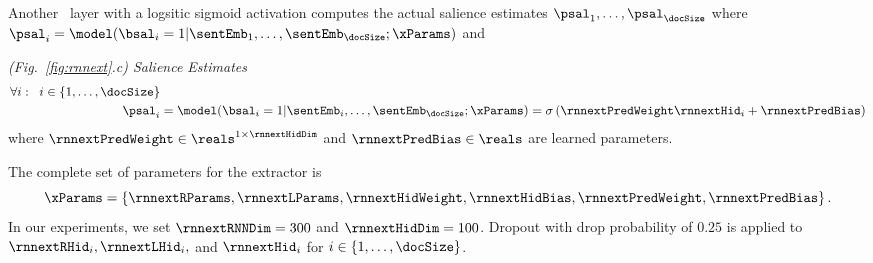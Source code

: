 Another \feedforward~layer
with a logsitic sigmoid activation computes the actual salience 
estimates $\psal_1,\ldots,\psal_\docSize$ where $\psal_i = \model(\bsal_i=1|\sentEmb_1,\ldots,\sentEmb_\docSize;\xParams)$ and 

\vspace{10pt}\noindent\textit{(Fig.~\ref{fig:rnnext}.c) Salience Estimates}
\begin{align}
    \forall i : \;\; i \in \{1,\ldots,\docSize\}& \nonumber \\
    \psal_i &= \model(\bsal_i=1|\sentEmb_i,\ldots,\sentEmb_\docSize; \xParams) = \sigma\left(\rnnextPredWeight\rnnextHid_i + \rnnextPredBias  \right)
\end{align}
where $\rnnextPredWeight \in \reals^{1 \times \rnnextHidDim}$
and $\rnnextPredBias \in \reals$ are learned parameters.

The complete set of parameters for the extractor is 
\[ \xParams = \left\{\rnnextRParams, \rnnextLParams, \rnnextHidWeight, \rnnextHidBias, \rnnextPredWeight, \rnnextPredBias \right\}.\]
In our experiments, we set $\rnnextRNNDim=300$ and $\rnnextHidDim=100$.
Dropout with drop probability of $0.25$ is applied to $\rnnextRHid_i, \rnnextLHid_i,$ and $\rnnextHid_i$ for $i \in \{1,\ldots,\docSize\}$.

\FloatBarrier


